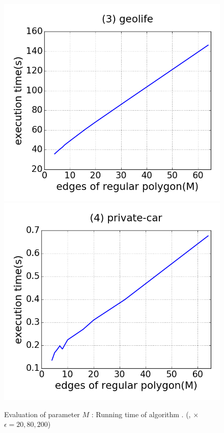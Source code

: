 \begin{figure}[tb!]
\includegraphics[scale = 0.25]{figures/Exp-M-time-geolife.png}
\includegraphics[scale = 0.25]{figures/Exp-M-time-private.png}
\vspace{-2ex}
\caption{\small Evaluation of parameter $M$ : Running time of algorithm \cist. (\rpia, \cpia $\times$ $\epsilon = 20, 80, 200$)}
\label{fig:m-time-cist}
\vspace{-1ex}
\end{figure}

